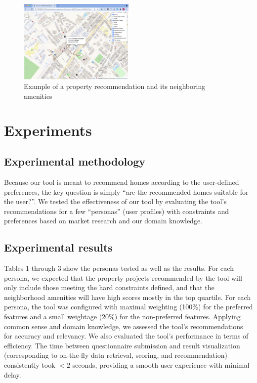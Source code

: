 \documentclass[a4paper, 11pt]{article}
\begin{document}
   \begin{figure}[h]
   \centering
   \includegraphics[width={0.5\textwidth}]{map.png}
   \caption{Example of a property recommendation and its neighboring amenities}
   \end{figure}
    
\section{Experiments}

\subsection{Experimental methodology}

Because our tool is meant to recommend homes according to the user-defined preferences, the key question is simply “are the recommended homes suitable for the user?”. We tested the effectiveness of our tool by evaluating the tool's recommendations for a few “personas” (user profiles) with constraints and preferences based on market research and our domain knowledge.

\subsection{Experimental results}

Tables 1 through 3 show the personas tested as well as the results. For each persona, we expected that the property projects recommended by the tool will only include those meeting the hard constraints defined, and that the neighborhood amenities will have high scores mostly in the top quartile. For each persona, the tool was configured with maximal weighting (100\%) for the preferred features and a small weightage (20\%) for the non-preferred features. Applying common sense and domain knowledge, we assessed the tool's recommendations for accuracy and relevancy. We also evaluated the tool's performance in terms of efficiency. The time between questionnaire submission and result visualization (corresponding to on-the-fly data retrieval, scoring, and recommendation) consistently took $<2$ seconds, providing a smooth user experience with minimal delay.
\end{document}

